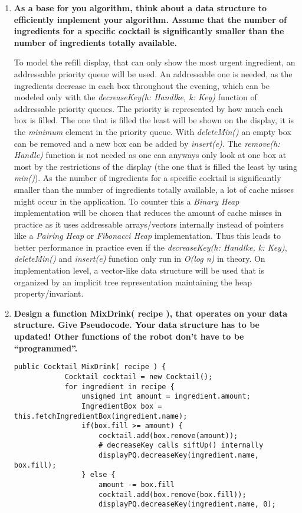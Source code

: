 \begin{enumerate}
    \item \textbf{As a base for you algorithm, think about a data structure to efficiently implement your algorithm. Assume that the number of ingredients for a specific cocktail is significantly smaller than the number of ingredients totally available.}
    
    To model the refill display, that can only show the most urgent ingredient, an addressable priority queue will be used. An addressable one is needed, as the ingredients decrease in each box throughout the evening, which can be modeled only with the \textit{decreaseKey(h: Handlke, k: Key)} function of addressable priority queues. The priority is represented by how much each box is filled. The one that is filled the least will be shown on the display, it is the \textit{minimum} element in the priority queue. With \textit{deleteMin()} an empty box can be removed and a new box can be added by \textit{insert(e)}. The \textit{remove(h: Handle)} function is not needed as one can anyways only look at one box at most by the restrictions of the display (the one that is filled the least by using \textit{min()}). As the number of ingredients for a specific cocktail is significantly smaller than the number of ingredients totally available, a lot of cache misses might occur in the application. To counter this a \textit{Binary Heap} implementation will be chosen that reduces the amount of cache misses in practice as it uses addressable arrays/vectors internally instead of pointers like a \textit{Pairing Heap} or \textit{Fibonacci Heap} implementation. Thus this leads to better performance in practice even if the \textit{decreaseKey(h: Handlke, k: Key)}, \textit{deleteMin()} and \textit{insert(e)} function only run in \textit{O(log n)} in theory. On implementation level, a vector-like data structure will be used that is organized by an implicit tree representation maintaining the heap property/invariant.

	\item \textbf{Design a function MixDrink( recipe ), that operates on your data structure. Give Pseudocode. Your data structure has to be updated! Other functions of the robot don’t have to be “programmed”.}
	
	\begin{lstlisting}[caption=The function MixDrink( recipe )]
		public Cocktail MixDrink( recipe ) {
			Cocktail cocktail = new Cocktail();
			for ingredient in recipe {
				unsigned int amount = ingredient.amount;
				IngredientBox box = this.fetchIngredientBox(ingredient.name);
				if(box.fill >= amount) {
					cocktail.add(box.remove(amount));
					# decreaseKey calls siftUp() internally
					displayPQ.decreaseKey(ingredient.name, box.fill);
				} else {
					amount -= box.fill
					cocktail.add(box.remove(box.fill));
					displayPQ.decreaseKey(ingredient.name, 0);
					

\end{lstlisting}
\end{enumerate}
